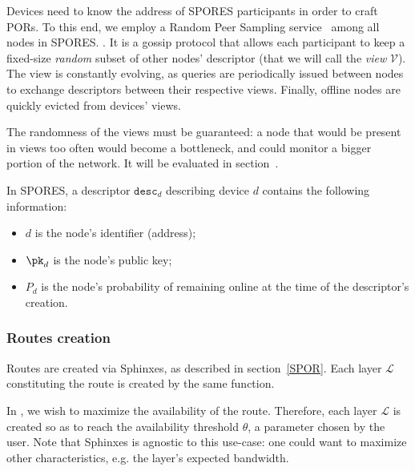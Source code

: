 \newcommand\rpsview{\ensuremath{\mathcal{V}}\xspace}
\newcommand\desc{\ensuremath{{\mathtt{desc}}}\xspace}


Devices need to know the address of SPORES participants in order to craft PORs.
To this end, we employ a Random Peer Sampling service~\cite{Jelasity_Voulgaris_Guerraoui_Kermarrec_van_Steen_2007} among all nodes in SPORES. .
It is a gossip protocol that allows each participant to keep a fixed-size \emph{random} subset of other nodes' descriptor (that we will call the \emph{view} \rpsview). 
The view is constantly evolving, as queries are periodically issued between nodes to exchange descriptors between their respective views.
Finally, offline nodes are quickly evicted from devices' views.

The randomness of the views must be guaranteed: 
a node that would be present in views too often would become a bottleneck, and could monitor a bigger portion of the network.
It will be evaluated in section~.

In SPORES, a descriptor $\desc_d$ describing device $d$ contains the following information:
\begin{itemize}
  \item \(d\) is the node's identifier (address);
  \item \(\pk_d\) is the node's public key;
  \item \(P_d\) is the node's probability of remaining online at the time of the descriptor's creation.
\end{itemize}


\subsubsection{Routes creation}
\label{sssec:routes_creation}

\newcommand\layer{\ensuremath{{\mathcal{L}}}\xspace}
\newcommand\Poff{\ensuremath{P_{\text{off}}}\xspace}

Routes are created via Sphinxes, as described in section~\ref{SPOR}.
Each layer \layer constituting the route is created by the same \CreateLayer\xspace function.

In \name, we wish to maximize the availability of the route.
Therefore, each layer \layer is created so as to reach the availability threshold $\theta$, a parameter chosen by the user.
Note that Sphinxes is agnostic to this use-case: one could want to maximize other characteristics, e.g. the layer's expected bandwidth.

